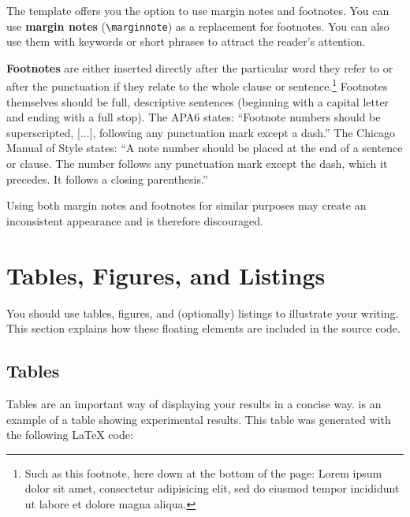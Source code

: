 The template offers you the option to use margin notes and footnotes. You can use \textbf{margin notes} (\verb|\marginnote|) as a replacement for footnotes. You can also use them with keywords or short phrases to attract the reader's attention.

\textbf{Footnotes} are either inserted directly after the particular word they refer to or after the punctuation if they relate to the whole clause or sentence.\footnote{Such as this footnote, here down at the bottom of the page: Lorem ipsum dolor sit amet, consectetur adipisicing elit, sed do eiusmod tempor incididunt ut labore et dolore magna aliqua.} Footnotes themselves should be full, descriptive sentences (beginning with a capital letter and ending with a full stop). The APA6 states: \enquote{Footnote numbers should be superscripted, [...], following any punctuation mark except a dash.} The Chicago Manual of Style states: \enquote{A note number should be placed at the end of a sentence or clause. The number follows any punctuation mark except the dash, which it precedes. It follows a closing parenthesis.}

Using both margin notes and footnotes for similar purposes may create an inconsistent appearance and is therefore discouraged.

\section{Tables, Figures, and Listings}

You should use tables, figures, and (optionally) listings to illustrate your writing. This section explains how these floating elements are included in the source code.

\subsection{Tables}

Tables are an important way of displaying your results in a concise way.  is an example of a table showing experimental results. This table was generated with the following LaTeX code:

